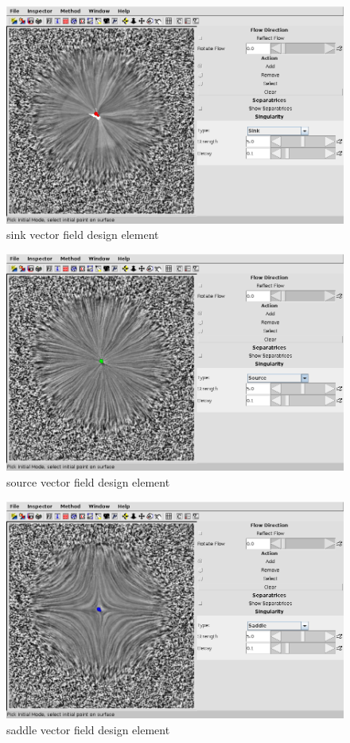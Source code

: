 \documentclass[a4paper,10pt,notitlepage]{scrreprt}
\begin{document}
\begin{figure}
  \centering
  \includegraphics[scale=0.5]{img-3-2/sink.png}
  \caption{sink vector field design element}
  \label{fig:sink}
\end{figure}

\begin{figure}
  \centering
  \includegraphics[scale=0.5]{img-3-2/source.png}
  \caption{source vector field design element}
  \label{fig:source}
\end{figure}

\begin{figure}
  \centering
  \includegraphics[scale=0.5]{img-3-2/saddle.png}
  \caption{saddle vector field design element}
  \label{fig:saddle}
\end{figure}
\end{document}
